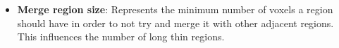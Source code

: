 \begin{itemize}
  
%  
  
  \item\textbf{Merge region size}: Represents the minimum number of voxels a region should have in order to not try and merge it with other adjacent regions. This influences the number of long thin regions.
  

\end{itemize}
